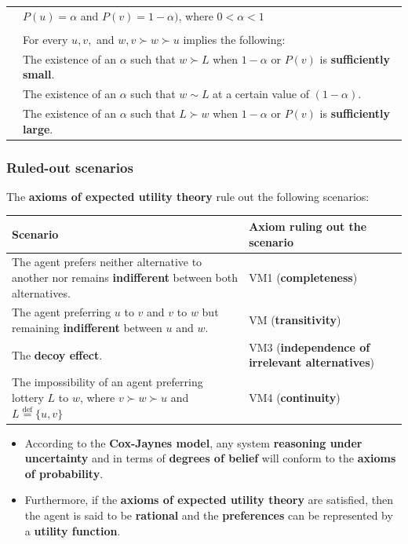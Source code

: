 \documentclass[11pt]{article}
\newcommand{\defequal}{\stackrel{\scriptscriptstyle\mathrm{def}}{=}}
\begin{document}
\begin{center}
\begin{tabular}{|m{7em}|m{25em}|}
 & \(P(u) = \alpha\) and \(P(v) = 1 - \alpha)\), where \(0 < \alpha < 1\)\\
 & \\
 & For every \(u, v,\) and \(w, v \succ w \succ u\) implies the following:\\
 & The existence of an \(\alpha\) such that \(w \succ L\) when \(1 - \alpha\) or \(P(v)\) is \textbf{sufficiently small}.\\
 & The existence of an \(\alpha\) such that \(w \sim L\) at a certain value of \((1 - \alpha)\).\\
 & The existence of an \(\alpha\) such that \(L \succ w\) when \(1 - \alpha\) or \(P(v)\) is \textbf{sufficiently large}.\\
\hline
\end{tabular}
\end{center}
\subsubsection{Ruled-out scenarios}
\label{sec:org4254b6f}
The \textbf{axioms of expected utility theory} rule out the following scenarios:
\begin{center}
\begin{tabularx}{\textwidth}{|X|X|}
\hline
Scenario & Axiom ruling out the scenario\\
\hline
The agent prefers neither alternative to another nor remains \textbf{indifferent} between both alternatives. & VM1 (\textbf{completeness})\\
\hline
The agent preferring \(u\) to \(v\) and \(v\) to \(w\) but remaining \textbf{indifferent} between \(u\) and \(w\). & VM (\textbf{transitivity})\\
\hline
The \textbf{decoy effect}. & VM3 (\textbf{independence of irrelevant alternatives})\\
\hline
The impossibility of an agent preferring lottery \(L\) to \(w\), where \(v \succ w \succ u\) and \(L \defequal \{u, v\}\) & VM4 (\textbf{continuity})\\
\hline
\end{tabularx}
\end{center}

\begin{itemize}
\item According to the \textbf{Cox-Jaynes model}, any system \textbf{reasoning under uncertainty} and in terms of \textbf{degrees of belief} will conform to the \textbf{axioms of probability}.
\item Furthermore, if the \textbf{axioms of expected utility theory} are satisfied, then the agent is said to be \textbf{rational} and the \textbf{preferences} can be represented by a \textbf{utility function}.
\end{itemize}
\end{document}
